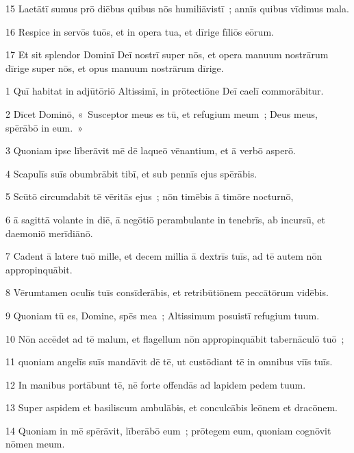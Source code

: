 \psalmVerse
  {\phantom{0}15}
  {Laetātī sumus prō diēbus quibus nōs humiliāvistī~; annīs quibus vīdimus mala.}


\psalmVerse
  {\phantom{0}16}
  {Respice in servōs tuōs, et in opera tua, et dīrige fīliōs eōrum.}


\psalmVerse
  {\phantom{0}17}
  {Et sit splendor Dominī Deī nostrī super nōs, et opera manuum nostrārum dīrige super nōs, et opus manuum nostrārum dīrige.}



\psalmVerse
  {\phantom{00}1}
  {Quī habitat in adjūtōriō Altissimī, in prōtectiōne Deī caelī commorābitur.}


\psalmVerse
  {\phantom{00}2}
  {Dīcet Dominō, «~Susceptor meus es tū, et refugium meum~; Deus meus, spērābō in eum.~»}


\psalmVerse
  {\phantom{00}3}
  {Quoniam ipse līberāvit mē dē laqueō vēnantium, et ā verbō asperō.}


\psalmVerse
  {\phantom{00}4}
  {Scapulīs suīs obumbrābit tibī, et sub pennīs ejus spērābis.}


\psalmVerse
  {\phantom{00}5}
  {Scūtō circumdabit tē vēritās ejus~; nōn timēbis ā timōre nocturnō,}


\psalmVerse
  {\phantom{00}6}
  {ā sagittā volante in diē, ā negōtiō perambulante in tenebrīs, ab incursū, et daemoniō merīdiānō.}


\psalmVerse
  {\phantom{00}7}
  {Cadent ā latere tuō mille, et decem millia ā dextrīs tuīs, ad tē autem nōn appropinquābit.}


\psalmVerse
  {\phantom{00}8}
  {Vērumtamen oculīs tuīs consīderābis, et retribūtiōnem peccātōrum vidēbis.}


\psalmVerse
  {\phantom{00}9}
  {Quoniam tū es, Domine, spēs mea~; Altissimum posuistī refugium tuum.}


\psalmVerse
  {\phantom{0}10}
  {Nōn accēdet ad tē malum, et flagellum nōn appropinquābit tabernāculō tuō~;}


\psalmVerse
  {\phantom{0}11}
  {quoniam angelīs suīs mandāvit dē tē, ut custōdiant tē in omnibus viīs tuīs.}


\psalmVerse
  {\phantom{0}12}
  {In manibus portābunt tē, nē forte offendās ad lapidem pedem tuum.}


\psalmVerse
  {\phantom{0}13}
  {Super aspidem et basiliscum ambulābis, et conculcābis leōnem et dracōnem.}


\psalmVerse
  {\phantom{0}14}
  {Quoniam in mē spērāvit, līberābō eum~; prōtegem eum, quoniam cognōvit nōmen meum.}


